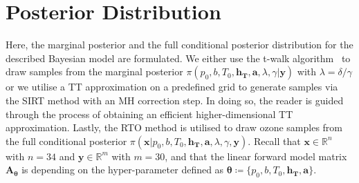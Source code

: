 \section{Posterior Distribution}
Here, the marginal posterior and the full conditional posterior distribution for the described Bayesian model are formulated.
We either use the t-walk algorithm~\cite{christen2010general} to draw samples from the marginal posterior $\pi(p_0,b,T_0,\bm{h_T},\bm{a} ,\lambda, \gamma| \bm{y})$ with $\lambda = \delta / \gamma$ or we utilise a TT approximation on a predefined grid to generate samples via the SIRT method with an MH correction step.
In doing so, the reader is guided through the process of obtaining an efficient higher-dimensional TT approximation.
Lastly, the RTO method is utilised to draw ozone samples from the full conditional posterior $\pi(\bm{x}|p_0,b,T_0,\bm{h_T},\bm{a} ,\lambda, \gamma, \bm{y})$.
Recall that $\bm{x} \in \mathbb{R}^n$ with $n = 34$ and $\bm{y} \in \mathbb{R}^m$ with $m = 30$, and that the linear forward model matrix $\bm{A}_{\bm{\theta}}$ is depending on the hyper-parameter defined as $\bm{\theta}  \coloneqq \{p_0,b,T_0,\bm{h_T},\bm{a}  \}$.
